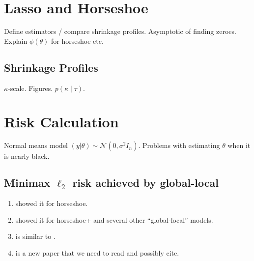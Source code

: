 \documentclass[11pt]{article}
\numberwithin{equation}{section}
\begin{document}
%
%

\section{Lasso and Horseshoe}
Define estimators / compare shrinkage profiles. Asymptotic of finding zeroes. 
Explain $\phi(\theta)$ for horseshoe etc. 

\subsection{Shrinkage Profiles}
$\kappa$-scale. Figures. $p(\kappa \mid \tau)$. 


\section{Risk Calculation}

Normal means model $(y | \theta) \sim \mathcal{N} (0, \sigma^2 I_n)$. Problems with estimating $\theta$ when it is nearly black.

\subsection{Minimax $\ell_2$ risk achieved by global-local}
\begin{enumerate}
\item  \citet{van2014horseshoe} showed it for horseshoe.

\item  \citet{van2015conditions} showed it for horseshoe+ and several other ``global-local'' models.

\item \citet{ghosh14} is similar to  \citet{van2015conditions}.

\item \citet{van2016many} is a new paper that we need to read and possibly cite. 

\end{enumerate}
\end{document}
